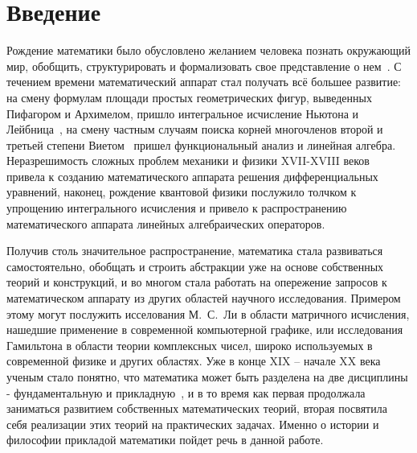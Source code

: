 


\tableofcontents

\section{Введение}
Рождение математики было обусловлено желанием человека познать окружающий мир, обобщить, структурировать и формализовать свое представление о нем~\cite{rudn}. С течением времени математический аппарат стал получать всё большее развитие: на смену формулам площади простых геометрических фигур, выведенных Пифагором и Архимелом, пришло интегральное исчисление Ньютона и Лейбница~\cite{w:integral}, на смену частным случаям поиска корней многочленов второй и третьей степени Виетом~\cite{w:viete} пришел функциональный анализ и линейная алгебра. Неразрешимость сложных проблем механики и физики XVII-XVIII веков~\cite{rudn} привела к созданию математического аппарата решения дифференциальных уравнений, наконец, рождение квантовой физики послужило толчком к упрощению интегрального исчисления и привело к распространению математического аппарата линейных алгебраических операторов.


Получив столь значительное распространение, математика стала развиваться самостоятельно, обобщать и строить абстракции уже на основе собственных теорий и конструкций, и во многом стала работать на опережение запросов к математическом аппарату из других областей научного исследования. Примером этому могут послужить исселования М.~С.~Ли в области матричного исчисления, нашедшие применение в современной компьютерной графике, или исследования Гамильтона в области теории комплексных чисел, широко используемых в современной физике и других областях. Уже в конце XIX -- начале XX века ученым стало понятно, что математика может быть разделена на две дисциплины - фундаментальную и прикладную~\cite{benzi}, и в то время как первая продолжала заниматься развитием собственных математических теорий, вторая посвятила себя реализации этих теорий на практических задачах. Именно о истории и философии прикладой математики пойдет речь в данной работе.


